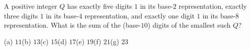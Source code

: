A positive integer $Q$ has exactly five digits $1$ in its base-$2$ representation, exactly three digits $1$ in its base-$4$ representation, and exactly one digit $1$ in its base-$8$ representation. What is the sum of the (base-$10$) digits of the smallest such $Q$?

(a) $11$\quad (b) $13$\quad (c) $15$\quad (d) $17$\quad (e) $19$\quad (f) $21$\quad (g) $23$
